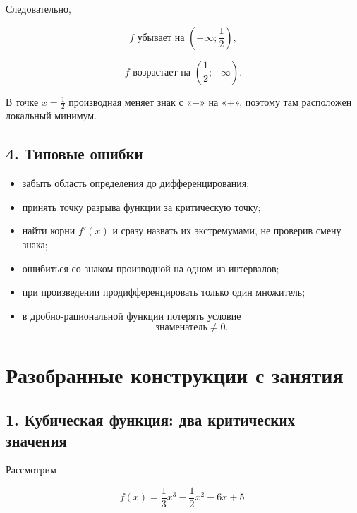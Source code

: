 \documentclass[a4paper,12pt]{article}
\begin{document}
Следовательно,

\[
f \text{ убывает на }
\left(-\infty;\frac12\right),
\]

\[
f \text{ возрастает на }
\left(\frac12;+\infty\right).
\]

В точке \(x=\frac12\) производная меняет знак с «\(-\)» на «\(+\)», поэтому там расположен локальный минимум.

\subsection*{4. Типовые ошибки}

\begin{itemize}

  \item
  забыть область определения до дифференцирования;

  \item
  принять точку разрыва функции за критическую точку;

  \item
  найти корни \(f'(x)\) и сразу назвать их экстремумами, не проверив смену знака;

  \item
  ошибиться со знаком производной на одном из интервалов;

  \item
  при произведении продифференцировать только один множитель;

  \item
  в дробно-рациональной функции потерять условие
  \[
  \text{знаменатель}\ne0.
  \]

\end{itemize}

\clearpage


\section*{Разобранные конструкции с занятия}

\subsection*{1. Кубическая функция: два критических значения}

Рассмотрим

\[
f(x)
=
\frac13x^3
-
\frac12x^2
-
6x
+
5.
\]
\end{document}
